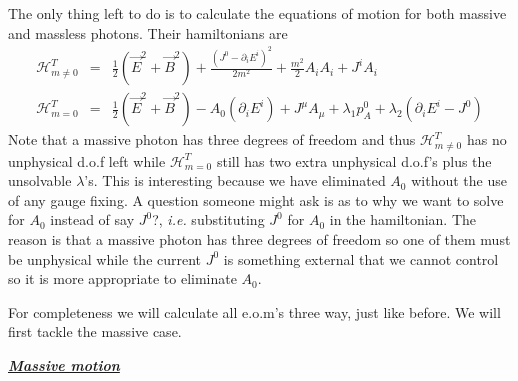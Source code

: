 \documentclass[aps,preprint,preprintnumbers,nofootinbib,showpacs,prd]{revtex4-1}
\newcommand{\ie}{{\it i.e.} }
\newcommand{\nbea}{\begin{eqnarray*}}
\newcommand{\neea}{\end{eqnarray*}}
\begin{document}
The only thing left to do is to calculate the equations of motion for both massive and massless photons. Their hamiltonians are
%
\nbea
\mathcal{H}^T_{m \neq 0} & = & \frac{1}{2} \left ( \vec E^2 + \vec B^2 \right ) + \frac{ (J^0 - \partial_i E^{i})^2}{2 m^2} + \frac{m^2}{2} A_i A_i + J^i A_i \\
\mathcal{H}^T_{m = 0} & = & \frac{1}{2} \left ( \vec E^2 + \vec B^2 \right ) - A_0 (\partial_i E^{i}) + J^\mu A_\mu + \lambda_1 p^0_A + \lambda_2 (\partial_i E^{i} - J^0)
\neea
%
Note that a massive photon has three degrees of freedom and thus $\mathcal{H}^T_{m \neq 0}$ has no unphysical d.o.f left while $\mathcal{H}^T_{m = 0}$ still has two extra unphysical d.o.f's plus the unsolvable $\lambda$'s. This is interesting because we have eliminated $A_0$ without the use of any gauge fixing. A question someone might ask is as to why we want to solve for $A_0$ instead of say $J^0$?, \ie substituting $J^0$ for $A_0$ in the hamiltonian. The reason is that a massive photon has three degrees of freedom so one of them must be unphysical while the current $J^0$ is something external that we cannot control so it is more appropriate to eliminate $A_0$.

For completeness we will calculate all e.o.m's three way, just like before. We will first tackle the massive case.

\bigskip
\underline{\textit{\textbf{Massive motion}}}
\end{document}
